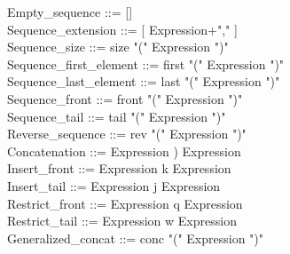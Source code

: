 \documentclass[12pt,a4paper,draft]{report}
\begin{document}
{\begin{sloppypar}
Empty\_sequence    ::= [] \\
Sequence\_extension  ::= [ Expression+"," ] \\
Sequence\_size   ::= size "(" Expression ")" \\
Sequence\_first\_element  ::= first "(" Expression ")" \\
Sequence\_last\_element  ::= last "(" Expression ")" \\
Sequence\_front    ::= front "(" Expression ")" \\
Sequence\_tail    ::= tail "(" Expression ")" \\
Reverse\_sequence   ::= rev "(" Expression ")" \\
Concatenation   ::=  Expression ) Expression \\
Insert\_front    ::=  Expression k Expression \\
Insert\_tail    ::=  Expression j Expression \\
Restrict\_front   ::=  Expression q Expression \\
Restrict\_tail    ::=  Expression w Expression \\
Generalized\_concat  ::= conc "(" Expression ")" \\ 
\\ 

\end{sloppypar}}
\end{document}
